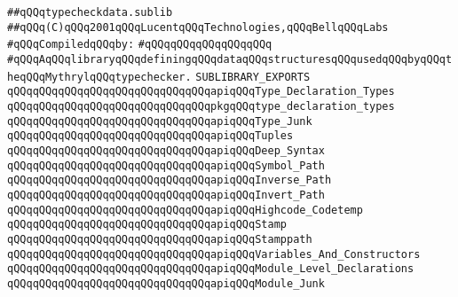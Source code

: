 \label{src/lib/compiler/front/typer-stuff/typecheckdata.sublib}
\verb|##qQQqtypecheckdata.sublib|\newline
\verb|##qQQq(C)qQQq2001qQQqLucentqQQqTechnologies,qQQqBellqQQqLabs|\newline
\newline
\verb|#qQQqCompiledqQQqby:|\newline
\verb|#qQQqqQQqqQQqqQQqqQQq|\newline
\newline
\newline
\verb|#qQQqAqQQqlibraryqQQqdefiningqQQqdataqQQqstructuresqQQqusedqQQqbyqQQqtheqQQqMythrylqQQqtypechecker.|\newline
\newline
\newline
\newline
\verb|SUBLIBRARY_EXPORTS|\newline
\newline
\verb|qQQqqQQqqQQqqQQqqQQqqQQqqQQqqQQqapiqQQqType_Declaration_Types|\newline
\verb|qQQqqQQqqQQqqQQqqQQqqQQqqQQqqQQqpkgqQQqtype_declaration_types|\newline
\newline
\verb|qQQqqQQqqQQqqQQqqQQqqQQqqQQqqQQqapiqQQqType_Junk|\newline
\verb|qQQqqQQqqQQqqQQqqQQqqQQqqQQqqQQqapiqQQqTuples|\newline
\verb|qQQqqQQqqQQqqQQqqQQqqQQqqQQqqQQqapiqQQqDeep_Syntax|\newline
\verb|qQQqqQQqqQQqqQQqqQQqqQQqqQQqqQQqapiqQQqSymbol_Path|\newline
\verb|qQQqqQQqqQQqqQQqqQQqqQQqqQQqqQQqapiqQQqInverse_Path|\newline
\verb|qQQqqQQqqQQqqQQqqQQqqQQqqQQqqQQqapiqQQqInvert_Path|\newline
\verb|qQQqqQQqqQQqqQQqqQQqqQQqqQQqqQQqapiqQQqHighcode_Codetemp|\newline
\verb|qQQqqQQqqQQqqQQqqQQqqQQqqQQqqQQqapiqQQqStamp|\newline
\verb|qQQqqQQqqQQqqQQqqQQqqQQqqQQqqQQqapiqQQqStamppath|\newline
\verb|qQQqqQQqqQQqqQQqqQQqqQQqqQQqqQQqapiqQQqVariables_And_Constructors|\newline
\verb|qQQqqQQqqQQqqQQqqQQqqQQqqQQqqQQqapiqQQqModule_Level_Declarations|\newline
\verb|qQQqqQQqqQQqqQQqqQQqqQQqqQQqqQQqapiqQQqModule_Junk|\newline

